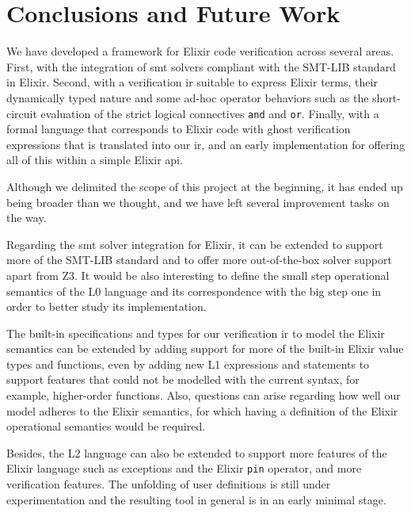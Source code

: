 \chapter{Conclusions and Future Work}
\label{cap:conclusions}


We have developed a framework for Elixir code verification across several areas.
First, with the integration of \acrshort{smt} solvers compliant with the SMT-LIB
standard in Elixir. Second, with a verification \gls{ir} suitable to express
Elixir terms, their dynamically typed nature and some ad-hoc operator behaviors
such as the short-circuit evaluation of the strict logical connectives
\verb|and| and \verb|or|. Finally, with a formal language that corresponds to 
Elixir code with ghost verification expressions that is translated into our
\gls{ir}, and an early implementation for offering all of this within a simple 
Elixir \gls{api}.

Although we delimited the scope of this project at the beginning, it has ended
up being broader than we thought, and we have left several improvement tasks on
the way.

Regarding the \acrshort{smt} solver integration for Elixir, it can be extended
to support more of the SMT-LIB standard and to offer more out-of-the-box solver 
support apart from Z3. It would be also interesting to define the small step 
operational semantics of the L0 language and its correspondence with the big
step one in order to better study its implementation.

The built-in specifications and types for our verification \gls{ir} to model the
Elixir semantics can be extended by adding support for more of the built-in
Elixir value types and functions, even by adding new L1 expressions and
statements to support features that could not be modelled with the current
syntax, for example, higher-order functions. Also, questions can arise regarding
how well our model adheres to the Elixir semantics, for which having a
definition of the Elixir operational semantics would be required.

Besides, the L2 language can also be extended to support more features of the Elixir
language such as exceptions and the Elixir \verb|pin| operator, and more verification features. The unfolding of user
definitions is still under experimentation and the resulting tool in general is
in an early minimal stage.

